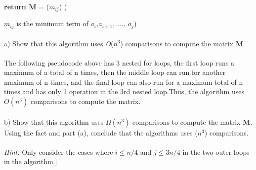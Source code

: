 \documentclass{article}
\begin{document}
\indent \textbf{return M} = ({$m_{ij}$}) ({\emph{{$m_{ij}$}} is the minimum term of \emph {$a_{i}$,$a_{i+1}$,...., $a_{j}$}) \\ \\ 
a) Show that this algorithm uses \emph{O}($n^3$) comparisons to compute the matrix \textbf {M} \\ \\ 
The following pseudocode above has 3 nested for loops, the first loop runs a maximum of a total of n times, then the middle loop can run for another maximum of n times, and the final loop can also run for a maximum total of n times and has only 1 operation in the 3rd nested loop.Thus, the algorithm uses $O(n^3)$ comparisons to compute the matrix. \\\\
b) Show that this algorithm uses $\Omega(n^3)$ comparisons to compute the matrix \textbf {M}. Using the fact and part (a), conclude that the algorithms uses ($n^3$) comparisons. \\ \\ \emph{Hint:} Only consider the cases where \emph{$i \leq n/4$} and \emph {$j \leq 3n/4$} in the two outer loops in the algorithm.] 
\newpage

}
\end{document}
